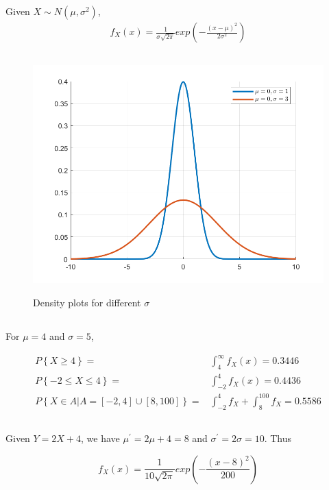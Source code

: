 \documentclass{article}
\begin{document}
Given $X\sim N(\mu, \sigma^2)$, 
\begin{align}
    f_X(x) = \frac{1}{\sigma\sqrt{2\pi}}exp(-\frac{(x-\mu)^2}{2\sigma^2})
\end{align}

\subsection{}

\begin{figure}[H]
    \centering
        \textsf{\includegraphics[width=0.6\columnwidth]{hw1-fig1.png}}
        \caption{Density plots for different $\sigma$}
        \label{fig: 1}
\end{figure}

\subsection{}
For $\mu = 4$ and $\sigma = 5$,

\begin{align*}
    P\left\{X\ge 4 \right\} =& \int^\infty_4 f_X(x) = 0.3446\\
    P\left\{-2\le X \le 4 \right\} = & \int^4_{-2} f_X(x) = 0.4436\\
    P\left\{X\in A|A = [-2, 4] \cup [8, 100]\right\} =& \int^4_{-2} f_X + \int^{100}_{8} f_X = 0.5586
\end{align*}

\subsection{}
Given $Y = 2X+4$, we have $\mu^\prime = 2\mu +4 = 8$ and $\sigma^\prime = 2\sigma = 10$. Thus

$$
f_X(x) = \frac{1}{10\sqrt{2\pi}}exp(-\frac{(x-8)^2}{200})
$$


\section{}
\end{document}
